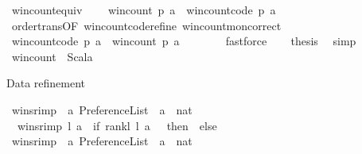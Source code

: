 \begin{isabellebody}
\isanewline
{}\isamarkupfalse%
\ win{\isacharunderscore}{\kern0pt}count{\isacharunderscore}{\kern0pt}equiv{\isacharcolon}{\kern0pt}\ \isanewline
\ \ \ {\isachardoublequoteopen}win{\isacharunderscore}{\kern0pt}count\ p\ a\ {\isacharequal}{\kern0pt}\ win{\isacharunderscore}{\kern0pt}count{\isacharunderscore}{\kern0pt}code\ p\ a{\isachardoublequoteclose}\isanewline
%
\isadelimproof
%
\endisadelimproof
%
\isatagproof
{}\isamarkupfalse%
\ {\isacharminus}{\kern0pt}\isanewline
\ \ \isamarkupfalse%
\ order{\isacharunderscore}{\kern0pt}trans{\isacharbrackleft}{\kern0pt}OF\ win{\isacharunderscore}{\kern0pt}count{\isacharunderscore}{\kern0pt}code{\isachardot}{\kern0pt}refine\ win{\isacharunderscore}{\kern0pt}count{\isacharunderscore}{\kern0pt}mon{\isacharunderscore}{\kern0pt}correct{\isacharbrackright}{\kern0pt}\ \isanewline
\ \ \ \ \isamarkupfalse%
\ {\isachardoublequoteopen}win{\isacharunderscore}{\kern0pt}count{\isacharunderscore}{\kern0pt}code\ p\ a\ {\isacharequal}{\kern0pt}\ win{\isacharunderscore}{\kern0pt}count\ p\ a{\isachardoublequoteclose}\isanewline
\ \ \ \ \ \ \isamarkupfalse%
\ fastforce\isanewline
\ \ \isamarkupfalse%
\ {\isacharquery}{\kern0pt}thesis\ \isamarkupfalse%
\ simp\isanewline
{}\isamarkupfalse%
%
\endisatagproof
{\isafoldproof}%
%
\isadelimproof
\isanewline
%
\endisadelimproof
\isanewline
{}\isamarkupfalse%
\ win{\isacharunderscore}{\kern0pt}count\ \ Scala%
\begin{isamarkuptext}%
Data refinement%
\end{isamarkuptext}\isamarkuptrue%
\isamarkupfalse%
\ winsr{\isacharunderscore}{\kern0pt}imp\ {\isacharcolon}{\kern0pt}{\isacharcolon}{\kern0pt}\ {\isachardoublequoteopen}{\isacharprime}{\kern0pt}a\ Preference{\isacharunderscore}{\kern0pt}List\ {\isasymRightarrow}\ {\isacharprime}{\kern0pt}a\ {\isasymRightarrow}\ nat{\isachardoublequoteclose}\ \isanewline
\ \ {\isachardoublequoteopen}winsr{\isacharunderscore}{\kern0pt}imp\ l\ a\ {\isasymequiv}\ {\isacharparenleft}{\kern0pt}if\ {\isacharparenleft}{\kern0pt}rank{\isacharunderscore}{\kern0pt}l\ l\ a\ {\isacharequal}{\kern0pt}\ {}{\isacharparenright}{\kern0pt}\ then\ {}\ else\ {}{\isacharparenright}{\kern0pt}{\isachardoublequoteclose}\isanewline
\isanewline
{}\isamarkupfalse%
\ winsr{\isacharunderscore}{\kern0pt}imp{\isacharprime}{\kern0pt}\ {\isacharcolon}{\kern0pt}{\isacharcolon}{\kern0pt}\ {\isachardoublequoteopen}{\isacharprime}{\kern0pt}a\ Preference{\isacharunderscore}{\kern0pt}List\ {\isasymRightarrow}\ {\isacharprime}{\kern0pt}a\ {\isasymRightarrow}\ nat{\isachardoublequoteclose}\ \isanewline

\end{isabellebody}
